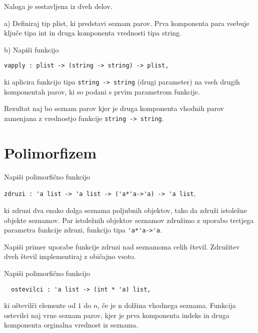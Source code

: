 \begin{ex}Naloga je sestavljena iz dveh delov.

  a) Definiraj tip plist, ki predstavi seznam parov. Prva komponenta
  para vsebuje klju\v ce tipa int in druga komponenta vrednosti tipa
  string.

  b) Napi\v si funkcijo  
\begin{lstlisting}
vapply : plist -> (string -> string) -> plist,
\end{lstlisting}
  ki aplicira funkcijo tipa \lstinline{string -> string} (drugi parameter) na vseh
  drugih komponentah parov, ki so podani s prvim parametrom
  funkcije. 

  Rezultat naj bo seznam parov kjer je druga komponenta vhodnih parov
  zamenjana z vrednostjo funkcije 
  \lstinline{string -> string}.
\end{ex} 




\section{Polimorfizem}



\begin{ex}
Napi\v si polimorfi\v cno funkcijo 

\begin{center}
\lstinline{zdruzi : 'a list -> 'a list -> ('a*'a->'a) -> 'a list}, 
\end{center}

ki zdruzi dva enako dolga seznama poljubnih objektov, tako da zdru\v zi istole\v zne objekte seznamov. Par istole\v znih objektov seznamov zdru\v zimo z uporabo tretjega parametra funkcije zdruzi, funkcijo tipa \lstinline{'a*'a->'a}.

Napi\v si primer uporabe funkcije zdruzi nad seznamoma celih \v stevil. Zdru\v zitev dveh \v stevil implementiraj z obi\v cajno vsoto. 
\end{ex}



\begin{ex}
  Napi\v si polimorfi\v cno funkcijo
  \begin{lstlisting}
  ostevilci : 'a list -> (int * 'a) list, 
  \end{lstlisting}
  ki o\v stevil\v ci elemente od $1$ do $n$, \v ce je n dol\v zina
  vhodnega seznama. Funkcija ostevilci naj vrne seznam parov, kjer je
  prva komponenta indeks in druga komponenta orginalna vrednost iz
  seznama.
\end{ex} 



